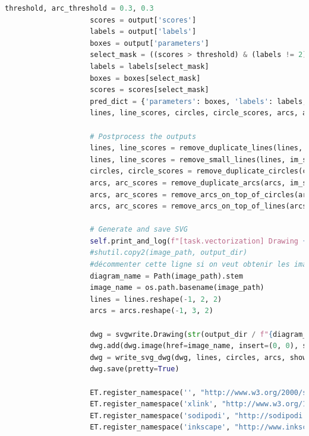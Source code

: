 \begin{lstlisting}[language=python, frame=single, breaklines=true, caption={Classe \texttt{ComputeVectorization}.}]
                    threshold, arc_threshold = 0.3, 0.3
                    scores = output['scores']
                    labels = output['labels']
                    boxes = output['parameters']
                    select_mask = ((scores > threshold) & (labels != 2)) | ((scores > arc_threshold) & (labels == 2))
                    labels = labels[select_mask]
                    boxes = boxes[select_mask]
                    scores = scores[select_mask]
                    pred_dict = {'parameters': boxes, 'labels': labels, 'scores': scores}
                    lines, line_scores, circles, circle_scores, arcs, arc_scores = get_outputs_per_class(pred_dict)

                    # Postprocess the outputs
                    lines, line_scores = remove_duplicate_lines(lines, im_shape, line_scores)
                    lines, line_scores = remove_small_lines(lines, im_shape, line_scores)
                    circles, circle_scores = remove_duplicate_circles(circles, im_shape, circle_scores)
                    arcs, arc_scores = remove_duplicate_arcs(arcs, im_shape, arc_scores)
                    arcs, arc_scores = remove_arcs_on_top_of_circles(arcs, circles, im_shape, arc_scores)
                    arcs, arc_scores = remove_arcs_on_top_of_lines(arcs, lines, im_shape, arc_scores)

                    # Generate and save SVG
                    self.print_and_log(f"[task.vectorization] Drawing {image_path}", color="blue")
                    #shutil.copy2(image_path, output_dir)
                    #décommenter cette ligne si on veut obtenir les images dans le répertoire de sortie
                    diagram_name = Path(image_path).stem
                    image_name = os.path.basename(image_path)
                    lines = lines.reshape(-1, 2, 2)
                    arcs = arcs.reshape(-1, 3, 2)

                    dwg = svgwrite.Drawing(str(output_dir / f"{diagram_name}.svg"), profile="tiny", size=im_shape)
                    dwg.add(dwg.image(href=image_name, insert=(0, 0), size=im_shape))
                    dwg = write_svg_dwg(dwg, lines, circles, arcs, show_image=False, image=None)
                    dwg.save(pretty=True)

                    ET.register_namespace('', "http://www.w3.org/2000/svg")
                    ET.register_namespace('xlink', "http://www.w3.org/1999/xlink")
                    ET.register_namespace('sodipodi', "http://sodipodi.sourceforge.net/DTD/sodipodi-0.dtd")
                    ET.register_namespace('inkscape', "http://www.inkscape.org/namespaces/inkscape")


\end{lstlisting}
